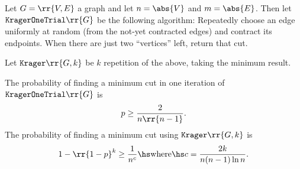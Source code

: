 \documentclass{article}
\begin{document}
\begin{algorithm}
  \label{alg:krager}
  Let $G= \rr{ V,E }$ a graph and let $n= \abs{ V }$ and $m= \abs{ E }$. Then let
  $\texttt{KragerOneTrial} \rr{ G }$ be the following algorithm: Repeatedly choose an edge
  uniformly at random (from the not-yet contracted edges) and contract its endpoints.
  When there are just two “vertices” left, return that cut.

  Let $ \texttt{Krager} \rr{ G, k }$ be $k$ repetition of the above, taking the minimum
  result.
\end{algorithm}

\begin{theorem}
  \label{thm:krager-probabilities}
  The probability of finding a minimum cut in one iteration of $ \texttt{KragerOneTrial} \rr{ G }$
  is
  \begin{align*}
    p \geq \frac{2}{n \rr{ n-1 }}.
  \end{align*}
  The probability of finding a minimum cut using $ \texttt{Krager} \rr{ G,k }$ is
  \begin{align*}
    1-\rr{ 1-p }^k \geq \frac{1}{n^c} \hs \text{where} \hs c = \frac{2k}{n(n-1)\ln n}.
  \end{align*}
\end{theorem}
\end{document}
